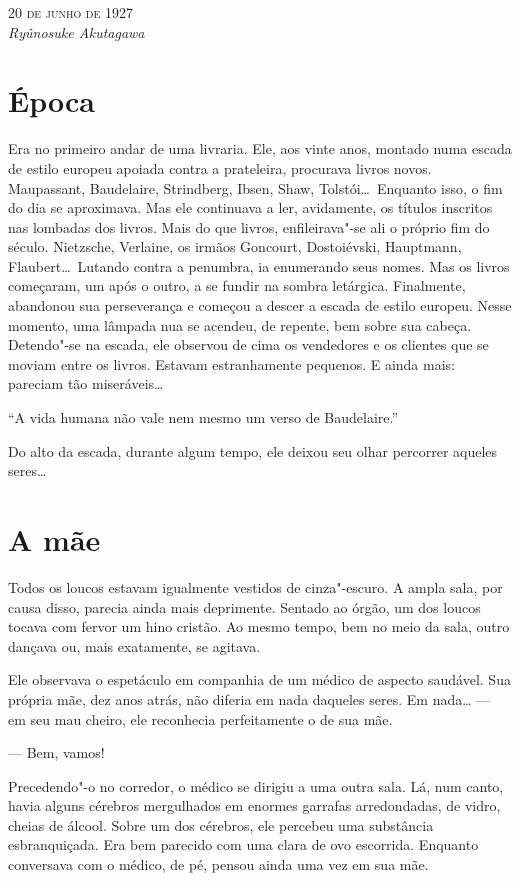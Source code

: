 \begin{flushright}
\textsc{20 de junho de 1927}\\
\textit{Ryûnosuke Akutagawa}
\end{flushright}

\section{Época}

Era no primeiro andar de uma livraria. Ele, aos vinte anos, montado numa
escada de estilo europeu apoiada contra a prateleira, procurava livros
novos. Maupassant, Baudelaire, Strindberg, Ibsen, Shaw, Tolstói\ldots{}\
Enquanto isso, o fim do dia se aproximava. Mas ele continuava a ler,
avidamente, os títulos inscritos nas lombadas dos livros. Mais do que
livros, enfileirava"-se ali o próprio fim do século. Nietzsche,
Verlaine, os irmãos Goncourt, Dostoiévski, Hauptmann, Flaubert\ldots{}\
Lutando contra a penumbra, ia enumerando seus nomes. Mas os livros
começaram, um após o outro, a se fundir na sombra letárgica.
Finalmente, abandonou sua perseverança e começou a descer a escada de
estilo europeu. Nesse momento, uma lâmpada nua se acendeu, de repente,
bem sobre sua cabeça. Detendo"-se na escada, ele observou de cima os
vendedores e os clientes que se moviam entre os livros. Estavam
estranhamente pequenos. E ainda mais: pareciam tão miseráveis\ldots{}

``A vida humana não vale nem mesmo um verso de Baudelaire.''

Do alto da escada, durante algum tempo, ele deixou seu olhar percorrer
aqueles seres\ldots{}

\section{A mãe}

Todos os loucos estavam igualmente vestidos de cinza"-escuro. A ampla
sala, por causa disso, parecia ainda mais deprimente. Sentado ao órgão,
um dos loucos tocava com fervor um hino cristão. Ao mesmo tempo, bem no
meio da sala, outro dançava ou, mais exatamente, se agitava.

Ele observava o espetáculo em companhia de um médico de aspecto
saudável. Sua própria mãe, dez anos atrás, não diferia em nada daqueles
seres. Em nada\ldots{} --- em seu mau cheiro, ele reconhecia perfeitamente o
de sua mãe.

--- Bem, vamos!

Precedendo"-o no corredor, o médico se dirigiu a uma outra sala. Lá, num
canto, havia alguns cérebros mergulhados em enormes garrafas
arredondadas, de vidro, cheias de álcool. Sobre um dos cérebros, ele
percebeu uma substância esbranquiçada. Era bem parecido com uma clara
de ovo escorrida. Enquanto conversava com o médico, de pé, pensou ainda
uma vez em sua mãe.

